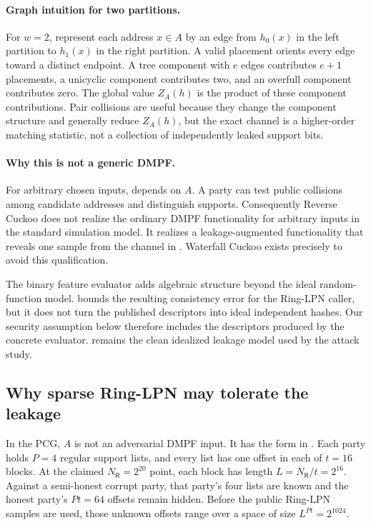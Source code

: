 \paragraph{Graph intuition for two partitions.}
For $w=2$, represent each address $x\in A$ by an edge from
$h_0(x)$ in the left partition to $h_1(x)$ in the right partition.  A valid
placement orients every edge toward a distinct endpoint.  A tree component
with $e$ edges contributes $e+1$ placements, a unicyclic component contributes
two, and an overfull component contributes zero.  The global value $Z_A(h)$
is the product of these component contributions.  Pair collisions are useful
because they change the component structure and generally reduce $Z_A(h)$,
but the exact channel is a higher-order matching statistic, not a collection
of independently leaked support bits.

\paragraph{Why this is not a generic DMPF.}
For arbitrary chosen inputs,  depends on
$A$.  A party can test public collisions among candidate addresses and
distinguish supports.  Consequently Reverse Cuckoo does not realize the
ordinary DMPF functionality for arbitrary inputs in the standard simulation
model.  It realizes a leakage-augmented functionality that reveals one sample
from the channel in .  Waterfall Cuckoo
exists precisely to avoid this qualification.

The binary feature evaluator adds algebraic structure beyond the ideal
random-function model.   bounds
the resulting consistency error for the Ring-LPN caller, but it does not turn
the published descriptors into ideal independent hashes.  Our security
assumption below therefore includes the descriptors produced by the concrete
evaluator.   remains the clean idealized
leakage model used by the attack study.

\subsection{Why sparse Ring-LPN may tolerate the leakage}

In the PCG, $A$ is not an adversarial DMPF input.  It has the form in
.  Each party holds $P=4$ regular
support lists, and every list has one offset in each of $t=16$ blocks.  At the
claimed $N_{\mathsf R}=2^{20}$ point, each block has length
$L=N_{\mathsf R}/t=2^{16}$.  Against a semi-honest corrupt party, that party's
four lists are known and the honest party's $Pt=64$ offsets remain hidden.
Before the public Ring-LPN samples are used, those unknown offsets range over
a space of size $L^{Pt}=2^{1024}$.

